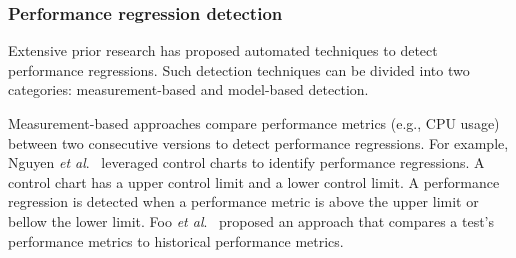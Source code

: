 \subsubsection{Performance regression detection}
Extensive prior research has proposed automated techniques to detect performance regressions. Such detection techniques can be divided into two categories: measurement-based and model-based detection. 

Measurement-based approaches compare performance metrics (e.g., CPU usage) between two consecutive versions to detect performance regressions. %
For example, Nguyen \emph{et al$.$}~\cite{Nguyen:2012:ADP,nguyen2011automated,Nguyen:2014:ICS} %
leveraged control charts to identify performance regressions. %
A control chart has a upper control limit and a lower control limit. A performance regression is detected when a performance metric is above the upper limit or bellow the lower limit. Foo \emph{et al$.$}~\cite{foo2010mining} proposed an approach that compares a test's performance metrics to historical performance metrics. %


